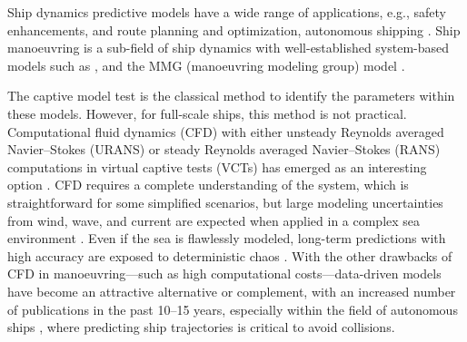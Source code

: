 Ship dynamics predictive models have a wide range of applications, e.g., safety enhancements, and route planning and optimization, autonomous shipping \citep{aslam_internet_2020}.
Ship manoeuvring is a sub-field of ship dynamics with well-established system-based models such as \citet{abkowitz_ship_1964,nomoto_steering_1957,norrbin_theory_1971}, and the MMG (manoeuvring modeling group) model \citep{yasukawa_introduction_2015}.

The captive model test is the classical method to identify the parameters within these models. However, for full-scale ships, this method is not practical. Computational fluid dynamics (CFD) with either unsteady Reynolds averaged Navier--Stokes (URANS) or steady Reynolds averaged Navier--Stokes (RANS) computations in virtual captive tests (VCTs) has emerged as an interesting option \citep{liu_predictions_2018,li_ship_2022}.
CFD requires a complete understanding of the system, which is straightforward for some simplified scenarios, but large modeling uncertainties from wind, wave, and current are expected when applied in a complex sea environment \citep{miller_ship_2021}. 
Even if the sea is flawlessly modeled, long-term predictions with high accuracy are exposed to deterministic chaos \citep{lorenz_deterministic_1963}.
With the other drawbacks of CFD in manoeuvring---such as high computational costs---data-driven models have become an attractive alternative or complement, with an increased number of publications in the past 10--15 years, %
especially within the field of autonomous ships \citep{ahmed_survey_2023}, where predicting  ship trajectories is critical to avoid collisions. 

